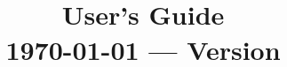 \title{\textbf{\Huge \akantu}\\
  \vspace{0.5cm}
  \textbf{\huge User's Guide}\\
  \vspace{1cm}
  {\small \today{} --- Version \version}
}

\author{}
\date{}

\makeindex



\setcounter{page}{1}
\renewcommand{\thepage}{\roman{page}}

\maketitle

\tableofcontents

\ifodd\value{page} \insertblankpage
\else \insertblankpage\insertblankpage \fi

\setcounter{page}{1}
\renewcommand\thepage{\arabic{page}}
